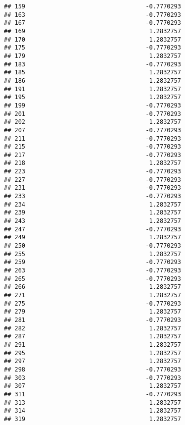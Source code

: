 \documentclass[
]{article}
\begin{document}
\begin{verbatim}
## 159                                  -0.7770293
## 163                                  -0.7770293
## 167                                  -0.7770293
## 169                                   1.2832757
## 170                                   1.2832757
## 175                                  -0.7770293
## 179                                   1.2832757
## 183                                  -0.7770293
## 185                                   1.2832757
## 186                                   1.2832757
## 191                                   1.2832757
## 195                                   1.2832757
## 199                                  -0.7770293
## 201                                  -0.7770293
## 202                                   1.2832757
## 207                                  -0.7770293
## 211                                  -0.7770293
## 215                                  -0.7770293
## 217                                  -0.7770293
## 218                                   1.2832757
## 223                                  -0.7770293
## 227                                  -0.7770293
## 231                                  -0.7770293
## 233                                  -0.7770293
## 234                                   1.2832757
## 239                                   1.2832757
## 243                                   1.2832757
## 247                                  -0.7770293
## 249                                   1.2832757
## 250                                  -0.7770293
## 255                                   1.2832757
## 259                                  -0.7770293
## 263                                  -0.7770293
## 265                                  -0.7770293
## 266                                   1.2832757
## 271                                   1.2832757
## 275                                  -0.7770293
## 279                                   1.2832757
## 281                                  -0.7770293
## 282                                   1.2832757
## 287                                   1.2832757
## 291                                   1.2832757
## 295                                   1.2832757
## 297                                   1.2832757
## 298                                  -0.7770293
## 303                                  -0.7770293
## 307                                   1.2832757
## 311                                  -0.7770293
## 313                                   1.2832757
## 314                                   1.2832757
## 319                                   1.2832757

\end{verbatim}
\end{document}
